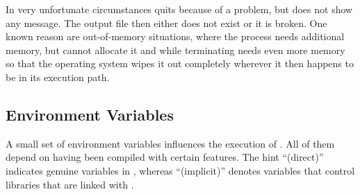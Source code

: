 In very unfortunate circumstances \App{} quits because of a problem, but does not show any
message.  The output file then either does not exist or it is broken.  One known reason are
out-of-memory situations, where the process needs additional memory, but cannot allocate it and
while terminating needs even more memory so that the operating system wipes it out completely
wherever it then happens to be in its execution path.


\subsection[Environment Variables]{\label{sec:environment-variables}%
  Environment Variables}

A small set of environment variables influences the execution of \appcmd.  All of them depend on
\appcmd{} having been compiled with certain features.  The hint ``(direct)'' indicates genuine
variables in \appcmd, whereas ``(implicit)'' denotes variables that control libraries that are
linked with \appcmd.

